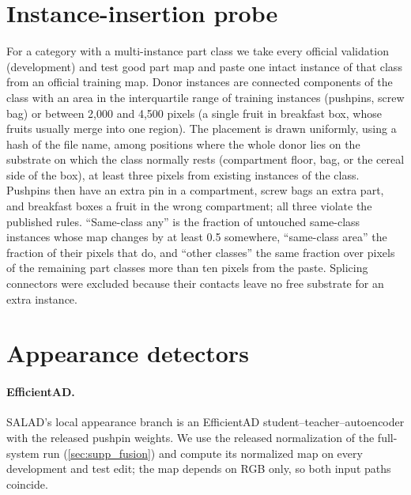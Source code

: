 \section{Instance-insertion probe}
\label{sec:supp_insertion}
For a category with a multi-instance part class we take every official validation (development) and test good part map and paste one intact instance of that class from an official training map. Donor instances are connected components of the class with an area in the interquartile range of training instances (pushpins, screw bag) or between 2{,}000 and 4{,}500 pixels (a single fruit in breakfast box, whose fruits usually merge into one region). The placement is drawn uniformly, using a hash of the file name, among positions where the whole donor lies on the substrate on which the class normally rests (compartment floor, bag, or the cereal side of the box), at least three pixels from existing instances of the class. Pushpins then have an extra pin in a compartment, screw bags an extra part, and breakfast boxes a fruit in the wrong compartment; all three violate the published rules. ``Same-class any'' is the fraction of untouched same-class instances whose map changes by at least 0.5 somewhere, ``same-class area'' the fraction of their pixels that do, and ``other classes'' the same fraction over pixels of the remaining part classes more than ten pixels from the paste. Splicing connectors were excluded because their contacts leave no free substrate for an extra instance.
\begin{table}[t]
\centering
\caption{Instance-insertion probe on part maps (composition branch). Instance AUROC ranks the pasted instance against the untouched instances of its class.}
\label{tab:insertion}
\footnotesize\setlength{\tabcolsep}{4pt}

\end{table}

\section{Appearance detectors}
\label{sec:supp_appearance}
\paragraph{EfficientAD.} SALAD's local appearance branch is an EfficientAD student--teacher--autoencoder \cite{batzner2024} with the released pushpin weights. We use the released normalization of the full-system run (\cref{sec:supp_fusion}) and compute its normalized map on every development and test edit; the map depends on RGB only, so both input paths coincide.
